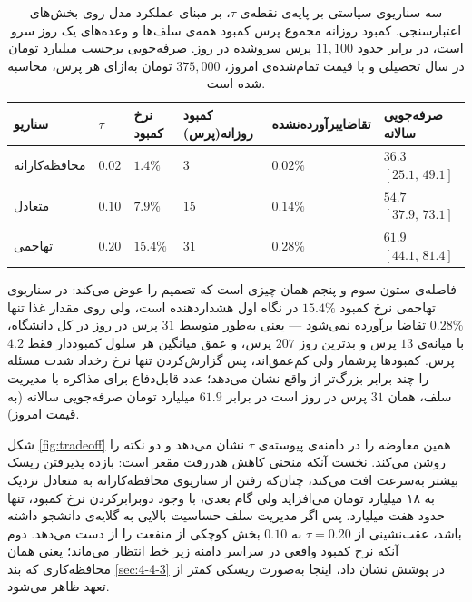 \begin{table}[!ht]
\centering
\footnotesize
\singlespacing
\renewcommand{\arraystretch}{0.9}
\setlength{\tabcolsep}{3pt}
\caption[سه سناریوی سیاستی بر پایه‌ی نقطه‌ی $\tau$]{%
سه سناریوی سیاستی بر پایه‌ی نقطه‌ی $\tau$، بر مبنای عملکرد مدل روی بخش‌های اعتبارسنجی.
کمبود روزانه مجموع پرس کمبود همه‌ی سلف‌ها و وعده‌های یک روز سرو است، در برابر حدود
$11{,}100$ پرس سرو‌شده در روز. صرفه‌جویی برحسب میلیارد تومان در سال تحصیلی و با قیمت
تمام‌شده‌ی امروز، $375{,}000$ تومان به‌ازای هر پرس، محاسبه شده است.}
\label{tab:policy}
\vspace{2mm}
\begin{tabular}{|p{2.1cm}|p{0.8cm}|p{1.4cm}|p{1.7cm}|p{1.9cm}|p{3.3cm}|}
\hline
\textbf{سناریو} & \textbf{$\tau$} & \textbf{نرخ کمبود} & \textbf{کمبود روزانه\newline (پرس)} &
\textbf{تقاضای\newline برآورده‌نشده} & \textbf{صرفه‌جویی سالانه} \\
\hline
محافظه‌کارانه & $0.02$ & $1.4\%$ & $3$ & $0.02\%$ & $36.3$ \quad $[25.1,\,49.1]$ \\
\hline
متعادل & $0.10$ & $7.9\%$ & $15$ & $0.14\%$ & $54.7$ \quad $[37.9,\,73.1]$ \\
\hline
تهاجمی & $0.20$ & $15.4\%$ & $31$ & $0.28\%$ & $61.9$ \quad $[44.1,\,81.4]$ \\
\hline
\end{tabular}
\end{table}

فاصله‌ی ستون سوم و پنجم همان چیزی است که تصمیم را عوض می‌کند: در سناریوی تهاجمی نرخ
کمبود $15.4\%$ در نگاه اول هشداردهنده است، ولی روی مقدار غذا تنها $0.28\%$ تقاضا
برآورده نمی‌شود — یعنی به‌طور متوسط $31$ پرس در روز در کل دانشگاه، با میانه‌ی $13$ پرس و
بدترین روز $207$ پرس، و عمق میانگین هر سلول کمبوددار فقط $4.2$ پرس. کمبودها پرشمار ولی
کم‌عمق‌اند، پس گزارش‌کردن تنها نرخ رخداد شدت مسئله را چند برابر بزرگ‌تر از واقع نشان
می‌دهد؛ عدد قابل‌دفاع برای مذاکره با مدیریت سلف، همان $31$ پرس در روز است در برابر
$61.9$ میلیارد تومان صرفه‌جویی سالانه (به قیمت امروز).

شکل \ref{fig:tradeoff} همین معاوضه را در دامنه‌ی پیوسته‌ی $\tau$ نشان می‌دهد و دو
نکته را روشن می‌کند. نخست آنکه منحنی کاهش هدررفت مقعر است: بازده پذیرفتن ریسک بیشتر
به‌سرعت افت می‌کند، چنان‌که رفتن از سناریوی محافظه‌کارانه به متعادل نزدیک به ۱۸ میلیارد
تومان می‌افزاید ولی گام بعدی، با وجود دوبرابرکردن نرخ کمبود، تنها حدود هفت میلیارد. پس
اگر مدیریت سلف حساسیت بالایی به گلایه‌ی دانشجو داشته باشد، عقب‌نشینی از $\tau = 0.20$
به $0.10$ بخش کوچکی از منفعت را از دست می‌دهد. دوم آنکه نرخ کمبود واقعی در سراسر دامنه
زیر خط انتظار می‌ماند؛ یعنی همان محافظه‌کاری که بند \ref{sec:4-4-3} در پوشش نشان داد،
اینجا به‌صورت ریسکی کمتر از تعهد ظاهر می‌شود.

